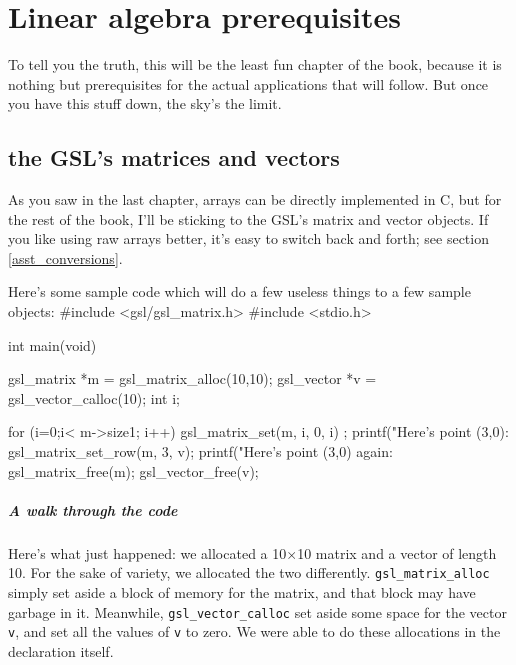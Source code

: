 \chapter[Linear Algebra]{Linear algebra prerequisites} \label{linear_algebra}

To tell you the truth, this will be the least fun chapter of the book,
because it is nothing but prerequisites for the actual applications that
will follow. But once you have this stuff down, the sky's the limit. 

\section{the GSL's matrices and vectors}
As you saw in the last chapter, arrays can be directly implemented in C, but for
the rest of the book, I'll be sticking to the GSL's matrix and vector objects.
If you like using raw arrays better, it's easy to switch back and forth; see
section \ref{asst_conversions}.


Here's some sample code which will do a few useless things to a few sample
objects:
#include <gsl/gsl_matrix.h>
#include <stdio.h>


int main(void){
   gsl_matrix   *m = gsl_matrix_alloc(10,10);
   gsl_vector   *v = gsl_vector_calloc(10);
   int  i;

   for (i=0;i< m->size1; i++){
      gsl_matrix_set(m, i, 0, i) ;
   }
   printf("Here's point (3,0): %
   gsl_matrix_set_row(m, 3, v);
   printf("Here's point (3,0) again: %
   gsl_matrix_free(m);
   gsl_vector_free(v);
}

\paragraph{A walk through the code}
Here's what just happened: we allocated a 10$\times$10 matrix and a vector of
length 10.  For the sake of variety, we  allocated the two differently.
{\tt gsl\_matrix\_alloc} simply set aside a block of memory for the matrix,
and that block may have garbage in it. Meanwhile, {\tt gsl\_vector\_calloc} set
aside some space for the vector {\tt v}, and set all the values of {\tt v} to
zero.  We were able to do these allocations in the declaration itself.

